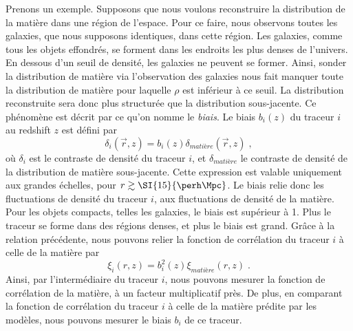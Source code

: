 Prenons un exemple. Supposons que nous voulons reconstruire la distribution de la matière dans une région de l'espace. Pour ce faire, nous observons toutes les galaxies, que nous supposons identiques, dans cette région.
Les galaxies, comme tous les objets effondrés, se forment dans les endroits les plus denses de l'univers.
En dessous d'un seuil de densité, les galaxies ne peuvent se former.
Ainsi, sonder la distribution de matière via l'observation des galaxies nous fait manquer toute la distribution de matière pour laquelle $\rho$ est inférieur à ce seuil.
La distribution reconstruite sera donc plus structurée que la distribution sous-jacente. Ce phénomène est décrit par ce qu'on nomme le \emph{biais}. Le biais $b_i(z)$ du traceur $i$ au redshift $z$ est défini par
\begin{equation}
  \label{eq:biais1}
  \delta_{i}(\vec r, z) = b_{i}(z) \delta_{matière}(\vec r, z) \; , 
\end{equation}
où $\delta_{i}$ est le contraste de densité du traceur $i$, et $\delta_{matière}$ le contraste de densité de la distribution de matière sous-jacente. Cette expression est valable uniquement aux grandes échelles, pour $r \gtrsim \SI{15}{\perh\Mpc}$. Le biais relie donc les fluctuations de densité du traceur $i$, aux fluctuations de densité de la matière. Pour les objets compacts, telles les galaxies, le biais est supérieur à 1. Plus le traceur se forme dans des régions denses, et plus le biais est grand. Grâce à la relation précédente, nous pouvons relier la fonction de corrélation du traceur $i$ à celle de la matière par
\begin{equation}
  \label{eq:biais2}
  \xi_{i}(r, z) = b_{i}^2(z) \xi_{matière}(r, z)  \; .
\end{equation}
Ainsi, par l'intermédiaire du traceur $i$, nous pouvons mesurer la fonction de corrélation de la matière, à un facteur multiplicatif près. De plus, en comparant la fonction de corrélation du traceur $i$ à celle de la matière prédite par les modèles, nous pouvons mesurer le biais $b_{i}$ de ce traceur. 
